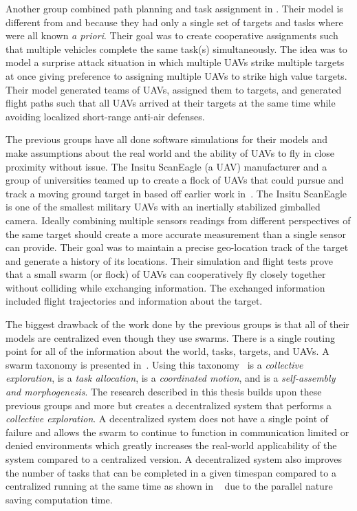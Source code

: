 Another group combined path planning and task assignment in \cite{beard}.  Their model is different from \cite{jin} and \cite{bellingham} because they had only a single set of targets and tasks where were all known \textit{a priori}.  Their goal was to create cooperative assignments such that multiple vehicles complete the same task(s) simultaneously.  The idea was to model a surprise attack situation in which multiple UAVs strike multiple targets at once giving preference to assigning multiple UAVs to strike high value targets.  Their model generated teams of UAVs, assigned them to targets, and generated flight paths such that all UAVs arrived at their targets at the same time while avoiding localized short-range anti-air defenses.

The previous groups have all done software simulations for their models and make assumptions about the real world and the ability of UAVs to fly in close proximity without issue.  The Insitu ScanEagle (a UAV) manufacturer and a group of universities teamed up to create a flock of UAVs that could pursue and track a moving ground target in \cite{wheeler} based off earlier work in~\cite{wise_rolf}.  The Insitu ScanEagle is one of the smallest military UAVs with an inertially stabilized gimballed camera.  Ideally combining multiple sensors readings from different perspectives of the same target should create a more accurate measurement than a single sensor can provide.  Their goal was to maintain a precise geo-location track of the target and generate a history of its locations.  Their simulation and flight tests prove that a small swarm (or flock) of UAVs can cooperatively fly closely together without colliding while exchanging information.  The exchanged information included flight trajectories and information about the target. 

The biggest drawback of the work done by the previous groups is that all of their models are centralized even though they use swarms.  There is a single routing point for all of the information about the world, tasks, targets, and UAVs.  A swarm taxonomy is presented in~\cite{iridia}.  Using this taxonomy~\cite{jin} is a \textit{collective exploration}, \cite{bellingham} is a \textit{task allocation}, \cite{beard} is a \textit{coordinated motion}, and \cite{wheeler} is a \textit{self-assembly and morphogenesis}.  The research described in this thesis  builds upon these previous groups and more but creates a decentralized system that performs a \textit{collective exploration}.  A decentralized system does not have a single point of failure and allows the swarm to continue to function in communication limited or denied environments which greatly increases the real-world applicability of the system compared to a centralized version.  A decentralized system also improves the number of tasks that can be completed in a given timespan compared to a centralized running at the same time as shown in ~\cite{chien} due to the parallel nature saving computation time.
